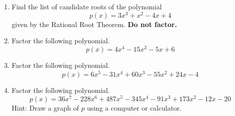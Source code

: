 \documentclass{article}
\begin{document}
\ActivityTitle[class={College Algebra}, number={4}, name={Polynomials 2}]

\begin{enumerate}
\item Find the list of candidate roots of the polynomial \[ p(x) = 3x^3 + x^2 - 4x + 4 \] given by the Rational Root Theorem. \textbf{Do not factor.}

   \vspace{3cm}

\item Factor the following polynomial. \[ p(x) = 4x^4 - 15x^2 - 5x + 6 \]

   \vspace{7cm}

\newpage

\item Factor the following polynomial. \[ p(x) = 6x^5 - 31x^4 + 60x^3 - 55x^2 + 24x - 4 \]

   \vspace{7cm}

\newpage

\item Factor the following polynomial. \[ p(x) = 36x^7 - 228x^6 + 487x^5 - 345x^4 - 91x^3 + 173x^2 - 12x - 20 \] Hint: Draw a graph of $p$ using a computer or calculator.

   \vspace{7cm}
\end{enumerate}
\end{document}
